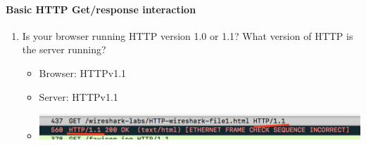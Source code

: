 \documentclass{article}
\begin{document}
\paragraph{Basic HTTP Get/response interaction}
    \begin{enumerate}
      \item Is your browser running HTTP version 1.0 or 1.1? What version of HTTP is the server running?
        \begin{itemize}
          \item Browser: HTTPv1.1
          \item Server: HTTPv1.1
          \item \includegraphics[scale=0.5]{images/HTTP1.png}
        \end{itemize}


\end{enumerate}
\end{document}
